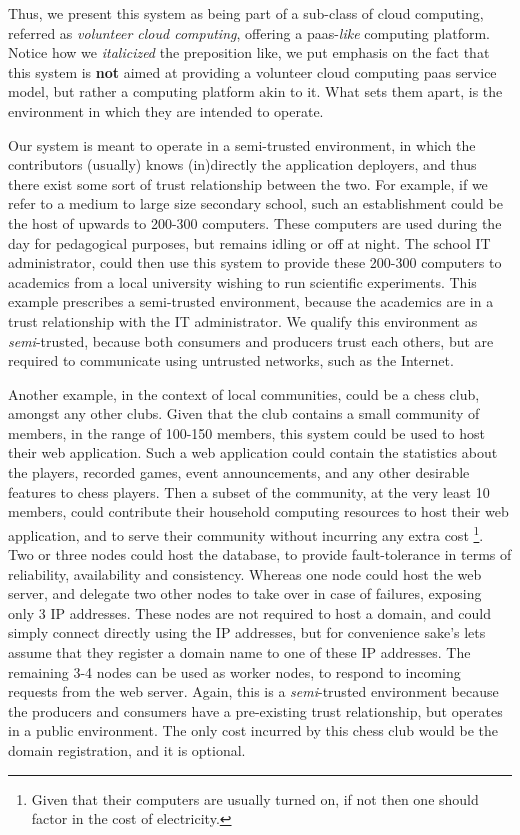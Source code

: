\documentclass[12pt, titlepage]{uo_temp}
\begin{document}
     Thus, we present this system as being part of a sub-class of cloud computing,
     referred as \emph{volunteer cloud computing}, offering a \gls{paas}-\emph{like} computing
     platform. Notice how we \emph{italicized} the preposition like, we put emphasis on
     the fact that this system is \textbf{not} aimed at providing a volunteer cloud
     computing \gls{paas} service model, but rather a computing platform akin to it. What
     sets them apart, is the environment in which they are intended to operate.

     Our system is meant to operate in a semi-trusted environment, in which the
     contributors (usually) knows (in)directly the application deployers, and thus there
     exist some sort of trust relationship between the two. For example, if we refer to a
     medium to large size secondary school, such an establishment could be the host of
     upwards to 200-300 computers. These computers are used during the day for pedagogical
     purposes, but remains idling or off at night. The school IT administrator, could then
     use this system to provide these 200-300 computers to academics from a local
     university wishing to run scientific experiments. This example prescribes a
     semi-trusted environment, because the academics are in a trust relationship with the
     IT administrator. We qualify this environment as \emph{semi}-trusted, because both
     consumers and producers trust each others, but are required to communicate using
     untrusted networks, such as the Internet.

     Another example, in the context of local communities, could be a chess club, amongst
     any other clubs. Given that the club contains a small community of members, in the
     range of 100-150 members, this system could be used to host their web
     application. Such a web application could contain the statistics about the players,
     recorded games, event announcements, and any other desirable features to chess
     players. Then a subset of the community, at the very least 10 members, could
     contribute their household computing resources to host their web application, and to
     serve their community without incurring any extra cost \footnote{Given that their
       computers are usually turned on, if not then one should factor in the cost of
       electricity.}. Two or three nodes could host the database, to provide
     fault-tolerance in terms of reliability, availability and consistency. Whereas one
     node could host the web server, and delegate two other nodes to take over in case of
     failures, exposing only 3 IP addresses. These nodes are not required to host a
     domain, and could simply connect directly using the IP addresses, but for convenience
     sake's lets assume that they register a domain name to one of these IP addresses. The
     remaining 3-4 nodes can be used as worker nodes, to respond to incoming requests from
     the web server. Again, this is a \emph{semi}-trusted environment because the
     producers and consumers have a pre-existing trust relationship, but operates in a
     public environment. The only cost incurred by this chess club would be the domain
     registration, and it is optional.
\end{document}
